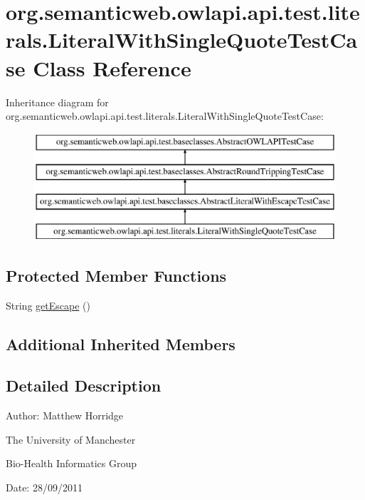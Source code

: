\hypertarget{classorg_1_1semanticweb_1_1owlapi_1_1api_1_1test_1_1literals_1_1_literal_with_single_quote_test_case}{\section{org.\-semanticweb.\-owlapi.\-api.\-test.\-literals.\-Literal\-With\-Single\-Quote\-Test\-Case Class Reference}
\label{classorg_1_1semanticweb_1_1owlapi_1_1api_1_1test_1_1literals_1_1_literal_with_single_quote_test_case}
}
Inheritance diagram for org.\-semanticweb.\-owlapi.\-api.\-test.\-literals.\-Literal\-With\-Single\-Quote\-Test\-Case\-:\begin{figure}[H]
\begin{center}
\leavevmode
\includegraphics[height=4.000000cm]{classorg_1_1semanticweb_1_1owlapi_1_1api_1_1test_1_1literals_1_1_literal_with_single_quote_test_case}
\end{center}
\end{figure}
\subsection*{Protected Member Functions}
\begin{DoxyCompactItemize}
\item 
String \hyperlink{classorg_1_1semanticweb_1_1owlapi_1_1api_1_1test_1_1literals_1_1_literal_with_single_quote_test_case_ac723e7f2eb2b4b4bc15b84aadbb3e5ce}{get\-Escape} ()
\end{DoxyCompactItemize}
\subsection*{Additional Inherited Members}


\subsection{Detailed Description}
Author\-: Matthew Horridge\par
 The University of Manchester\par
 Bio-\/\-Health Informatics Group\par
 Date\-: 28/09/2011 

